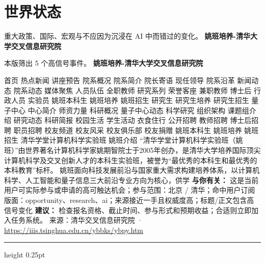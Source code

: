 \documentclass[10.5pt]{ctexart}
\begin{document}
\section*{世界状态}
{\color{ormuted} 重大政策、国际、宏观与不应因为沉浸在 AI 中而错过的变化。}
\vspace{2mm}
{\LARGE\bfseries 姚班培养-清华大学交叉信息研究院}\par
\vspace{1mm}
{\color{ormuted} 本版筛出 5 个高信号事件。}
\vspace{3mm}
{\Large\bfseries 姚班培养-清华大学交叉信息研究院}\par
首页 热点新闻 讲座预告 院系概况 院系简介 院长寄语 现任领导 院系沿革 新闻动态 院系动态 媒体聚焦 人员队伍 全职教师 研究系列 荣誉客座 兼职教师 博士后 行政人员 实验员 姚班本科生 姚班培养 姚班招生 研究生 研究生培养 研究生招生 量子中心 中心简介 师资力量 科研概况 量子中心动态 科学研究 组织架构 课题组介绍 研究动态 科研简报 校园生活 学生活动 衣食住行 公开招聘 教师招聘 博士后招聘 职员招聘 校友频道 校友风采 校友俱乐部 校友捐赠 姚班本科生 姚班培养 姚班招生 清华学堂计算机科学实验班 姚班介绍 “清华学堂计算机科学实验班（姚班）”由世界著名计算机科学家姚期智院士于2005年创办，是清华大学培养国际顶尖计算机科学及交叉创新人才的本科生实验班，被誉为“最优秀的本科生和最优秀的本科教育”标杆。 姚班面向科技发展前沿与国家重大需求构建培养体系，以计算机科学、人工智能和量子信息三大前沿专业方向为核心，供学
\textbf{与你有关：} 这是当前用户可实际参与或申请的高可触达机会；参与范围：北京 / 清华；命中用户订阅版面：opportunity、research、ai；来源接近一手且权威度高；标题/正文包含高信号变化
\textbf{建议：} 检查报名资格、截止时间、参与形式和预期收益；合适则立即加入任务系统。
{\footnotesize\color{ormuted} 来源：清华交叉信息研究院 · \url{https://iiis.tsinghua.edu.cn/ybbks/ybpy.htm}}
\vspace{4mm}
\hrule height 0.25pt
\vspace{3mm}
\end{document}
